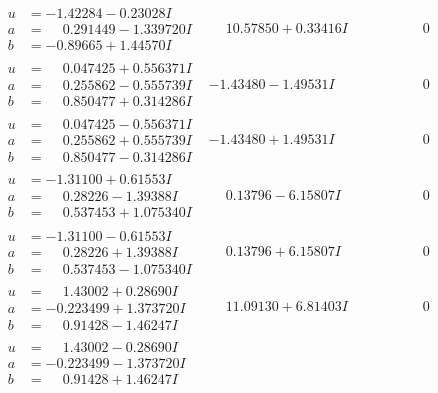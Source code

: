 \documentclass[1p]{elsarticle_modified}
\theoremstyle{definition}
\begin{document}
$$\begin{array}{c|c|c}
\begin{aligned}
u &= -1.42284 - 0.23028 I \\
a &= \phantom{-}0.291449 - 1.339720 I \\
b &= -0.89665 + 1.44570 I\end{aligned}
 & \phantom{-}10.57850 + 0.33416 I & \phantom{-0.000000 } 0 \\ \hline\begin{aligned}
u &= \phantom{-}0.047425 + 0.556371 I \\
a &= \phantom{-}0.255862 - 0.555739 I \\
b &= \phantom{-}0.850477 + 0.314286 I\end{aligned}
 & -1.43480 - 1.49531 I & \phantom{-0.000000 } 0 \\ \hline\begin{aligned}
u &= \phantom{-}0.047425 - 0.556371 I \\
a &= \phantom{-}0.255862 + 0.555739 I \\
b &= \phantom{-}0.850477 - 0.314286 I\end{aligned}
 & -1.43480 + 1.49531 I & \phantom{-0.000000 } 0 \\ \hline\begin{aligned}
u &= -1.31100 + 0.61553 I \\
a &= \phantom{-}0.28226 - 1.39388 I \\
b &= \phantom{-}0.537453 + 1.075340 I\end{aligned}
 & \phantom{-}0.13796 - 6.15807 I & \phantom{-0.000000 } 0 \\ \hline\begin{aligned}
u &= -1.31100 - 0.61553 I \\
a &= \phantom{-}0.28226 + 1.39388 I \\
b &= \phantom{-}0.537453 - 1.075340 I\end{aligned}
 & \phantom{-}0.13796 + 6.15807 I & \phantom{-0.000000 } 0 \\ \hline\begin{aligned}
u &= \phantom{-}1.43002 + 0.28690 I \\
a &= -0.223499 + 1.373720 I \\
b &= \phantom{-}0.91428 - 1.46247 I\end{aligned}
 & \phantom{-}11.09130 + 6.81403 I & \phantom{-0.000000 } 0 \\ \hline\begin{aligned}
u &= \phantom{-}1.43002 - 0.28690 I \\
a &= -0.223499 - 1.373720 I \\
b &= \phantom{-}0.91428 + 1.46247 I\end{aligned}

\end{array}$$
\end{document}
